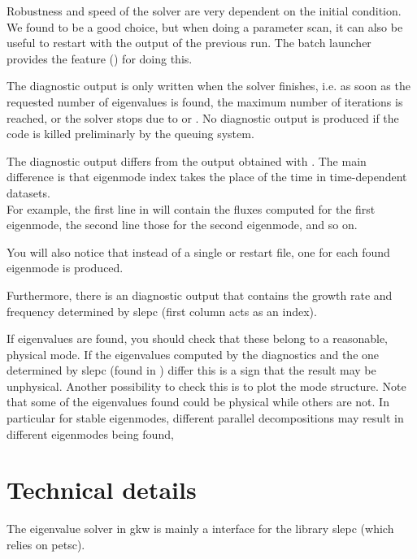 Robustness and speed of the solver are very dependent on the initial condition.
We found  to be a good choice, but when
doing a parameter scan, it can also be useful to restart with the output of the previous
run.  The batch launcher  provides the feature () for doing 
this.

The diagnostic output is only written when the solver finishes,
i.e. as soon as the requested number of eigenvalues is found, the
maximum number of iterations is reached, 
or the solver stops due to  or . 
No diagnostic output is produced if the code is killed preliminarly by the queuing system.

The diagnostic output differs from the output obtained with .
The main difference is that eigenmode index takes the place of the time in time-dependent datasets.\\
 For example, the first line in  will contain
the fluxes computed for the first eigenmode, the second line those for
the second eigenmode, and so on.

You will also notice that instead of a single  or restart file, one for each found eigenmode is produced.

Furthermore, there is an diagnostic output  that contains the growth
rate and frequency determined by {\sc slepc} (first column acts as an index).

If eigenvalues are found, you should check that these belong to a
reasonable, physical mode. If
the eigenvalues computed by the  diagnostics and the one
determined by slepc (found in ) differ this is a sign
that the result may be unphysical. 
Another possibility to check this is to plot the mode structure.
Note that some of the eigenvalues found could be physical while others
are not. In particular for stable eigenmodes, different parallel decompositions 
 may result in different eigenmodes being found, 


\section{Technical details}
\label{sec:eivtechdetails}
The eigenvalue solver in {\sc gkw} is mainly a interface for the library
 {\sc slepc} (which relies on {\sc petsc}).

